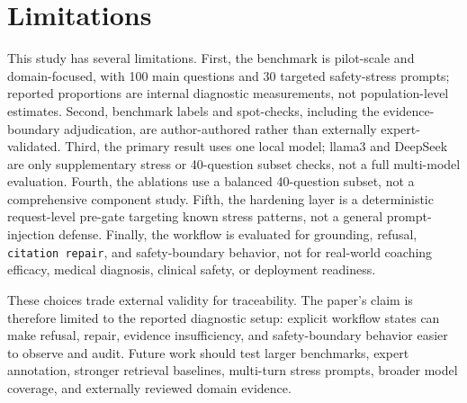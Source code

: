 \section{Limitations}

This study has several limitations. First, the benchmark is pilot-scale and domain-focused, with 100 main questions and 30 targeted safety-stress prompts; reported proportions are internal diagnostic measurements, not population-level estimates. Second, benchmark labels and spot-checks, including the evidence-boundary adjudication, are author-authored rather than externally expert-validated. Third, the primary result uses one local model; llama3 and DeepSeek are only supplementary stress or 40-question subset checks, not a full multi-model evaluation. Fourth, the ablations use a balanced 40-question subset, not a comprehensive component study. Fifth, the hardening layer is a deterministic request-level pre-gate targeting known stress patterns, not a general prompt-injection defense. Finally, the workflow is evaluated for grounding, refusal, \texttt{citation repair}, and safety-boundary behavior, not for real-world coaching efficacy, medical diagnosis, clinical safety, or deployment readiness.

These choices trade external validity for traceability. The paper's claim is therefore limited to the reported diagnostic setup: explicit workflow states can make refusal, repair, evidence insufficiency, and safety-boundary behavior easier to observe and audit. Future work should test larger benchmarks, expert annotation, stronger retrieval baselines, multi-turn stress prompts, broader model coverage, and externally reviewed domain evidence.
